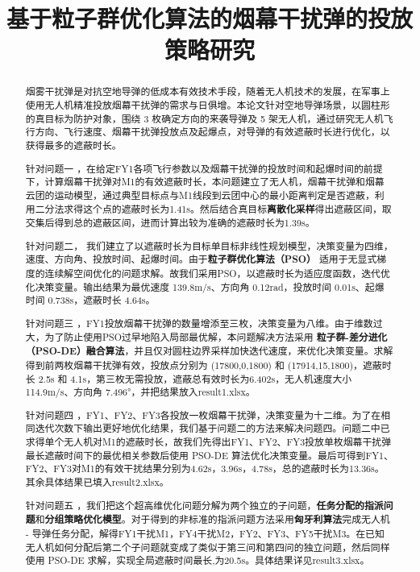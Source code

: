 \documentclass[withoutpreface]{cumcmthesis}
\title{基于粒子群优化算法的烟幕干扰弹的投放策略研究}
\begin{document}
%
\maketitle
{}
\begin{abstract}
烟雾干扰弹是对抗空地导弹的低成本有效技术手段，随着无人机技术的发展，在军事上使用无人机精准投放烟幕干扰弹的需求与日俱增。本论文针对空地导弹场景，以圆柱形的真目标为防护对象，围绕 3 枚确定方向的来袭导弹及 5 架无人机，通过研究无人机飞行方向、飞行速度、烟幕干扰弹投放点及起爆点，对导弹的有效遮蔽时长进行优化，以获得最多的遮蔽时长。

针对问题一 ，在给定FY1各项飞行参数以及烟幕干扰弹的投放时间和起爆时间的前提下，计算烟幕干扰弹对M1的有效遮蔽时长，本问题建立了无人机，烟幕干扰弹和烟幕云团的运动模型，通过典型目标点与M1线段到云团中心的最小距离判定是否遮蔽，利用二分法求得这个点的遮蔽时长为1.41s。然后结合真目标\textbf{离散化采样}得出遮蔽区间，取交集后得到总的遮蔽区间，进而计算出较为准确的遮蔽时长为1.39s。

针对问题二， 我们建立了以遮蔽时长为目标单目标非线性规划模型，决策变量为四维，速度、方向角、投放时间、起爆时间。由于\textbf{粒子群优化算法（PSO）} 适用于无显式梯度的连续解空间优化的问题求解。故我们采用PSO，以遮蔽时长为适应度函数，迭代优化决策变量。输出结果为最优速度 139.8m/s、方向角 0.12rad，投放时间 0.01s、起爆时间 0.738s，遮蔽时长 4.64s。

针对问题三 ，FY1投放烟幕干扰弹的数量增添至三枚，决策变量为八维。由于维数过大，为了防止使用PSO过早地陷入局部最优解，本问题解决方法采用 \textbf{粒子群-差分进化（PSO-DE）融合算法}，并且仅对圆柱边界采样加快迭代速度，来优化决策变量。求解得到前两枚烟幕干扰弹有效，投放点分别为 (17800,0,1800) 和 (17914,15,1800)，遮蔽时长 2.5s 和 4.1s，第三枚无需投放，遮蔽总有效时长为6.402s，无人机速度大小114.9m/s、方向角 7.496°，并把结果放入result1.xlsx。

针对问题四 ，FY1、FY2、FY3各投放一枚烟幕干扰弹，决策变量为十二维。为了在相同迭代次数下输出更好地优化结果，我们基于问题二的方法来解决问题四。问题二中已求得单个无人机对M1的遮蔽时长，故我们先得出FY1、FY2、FY3投放单枚烟幕干扰弹最长遮蔽时间下的最优相关参数后使用 PSO-DE 算法优化决策变量。最后可得到FY1、FY2、FY3对M1的有效干扰结果分别为4.62s，3.96s，4.78s，总的遮蔽时长为13.36s。其余具体结果已填入result2.xlsx。

针对问题五 ，我们把这个超高维优化问题分解为两个独立的子问题，\textbf{任务分配的指派问题}和\textbf{分组策略优化模型}。对于得到的非标准的指派问题方法采用\textbf{匈牙利算法}完成无人机 - 导弹任务分配，解得FY1干扰M1，FY4干扰M2，FY2、FY3、FY5干扰M3。在已知无人机如何分配后第二个子问题就变成了类似于第三问和第四问的独立问题，然后同样使用 PSO-DE 求解，实现全局遮蔽时间最长,为20.5s。具体结果详见result3.xlsx。
\end{abstract}
\end{document}
